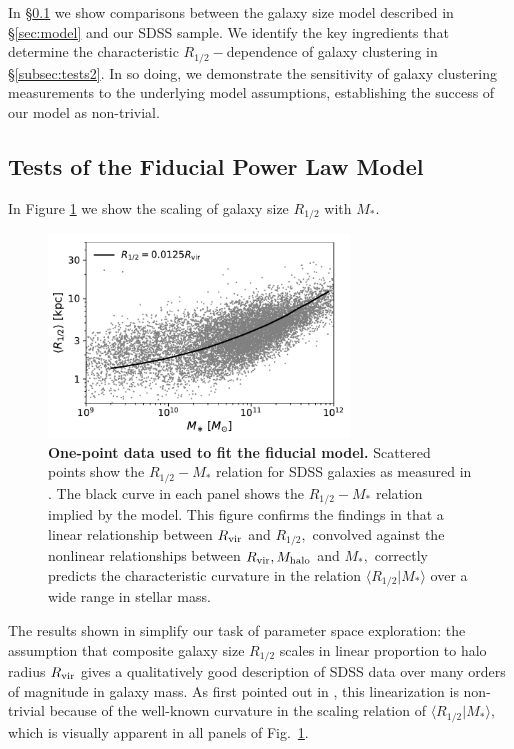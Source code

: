 \documentclass[usenatbib,usegraphicx,letterpaper]{mn2e}
\newcommand{\rhalf}{R_{1/2}}
\newcommand{\mstar}{M_{\ast}}
\newcommand{\mhalo}{M_{\rm halo}}
\newcommand{\rvir}{R_{\rm vir}}
\begin{document}
In \S\ref{subsec:tests1} we show comparisons between the galaxy size model described in \S\ref{sec:model} and our SDSS sample. We identify the key ingredients that determine the characteristic $\rhalf-$dependence of galaxy clustering in \S\ref{subsec:tests2}. In so doing, we demonstrate the sensitivity of galaxy clustering measurements to the underlying model assumptions, establishing the success of our model as non-trivial. 

\subsection{Tests of the Fiducial Power Law Model}
\label{subsec:tests1}

In Figure \ref{fig:scatter_plot} we show the scaling of galaxy size $\rhalf$ with $\mstar.$ 
\begin{figure}
\centering
\includegraphics[width=8cm]{FIGS/single_component_model_vs_sdss_one_point.pdf}
\caption{
{\bf One-point data used to fit the fiducial model.}
Scattered points show the $\rhalf-\mstar$ relation for SDSS galaxies as measured in \citet{meert_etal15}. The black curve in each panel shows the $\rhalf-\mstar$ relation implied by the model. This figure confirms the findings in \citet{kravtsov13} that a linear relationship between $\rvir$ and $\rhalf,$ convolved against the nonlinear relationships between $\rvir, \mhalo$ and $\mstar,$ correctly predicts the characteristic curvature in the relation $\langle\rhalf\vert\mstar\rangle$ over a wide range in stellar mass.
}
\label{fig:scatter_plot}
\end{figure}

The results shown in \citet{kravtsov13} simplify our task of parameter space exploration: the assumption that composite galaxy size $\rhalf$ scales in linear proportion to halo radius $\rvir$ gives a qualitatively good description of SDSS data over many orders of magnitude in galaxy mass. As first pointed out in \citet{kravtsov13}, this linearization is non-trivial because of the well-known curvature in the scaling relation of $\langle\rhalf\vert\mstar\rangle,$ which is visually apparent in all panels of Fig.~\ref{fig:scatter_plot}.
\end{document}
